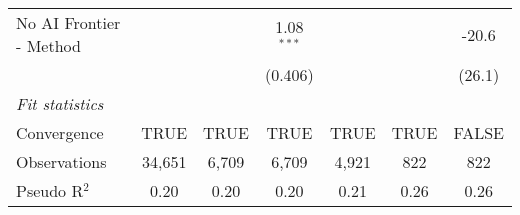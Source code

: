 \begin{tabular}{lcccccc}
   No AI Frontier - Method &               &             & 1.08$^{***}$ &              &              & -20.6\\   
                           &               &             & (0.406)      &              &              & (26.1)\\   
   \midrule
   \emph{Fit statistics}\\
   Convergence             &TRUE           & TRUE        & TRUE         & TRUE         & TRUE         & FALSE\\  
   Observations            & 34,651        & 6,709       & 6,709        & 4,921        & 822          & 822\\  
   Pseudo R$^2$            & 0.20          & 0.20        & 0.20         & 0.21         & 0.26         & 0.26\\  
   

\end{tabular}

